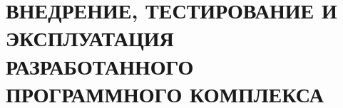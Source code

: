 \chapter{{\fontsize{14pt}{21pt}\selectfont\MakeUppercase{ВНЕДРЕНИЕ, ТЕСТИРОВАНИЕ И ЭКСПЛУАТАЦИЯ РАЗРАБОТАННОГО ПРОГРАММНОГО КОМПЛЕКСА}}}

